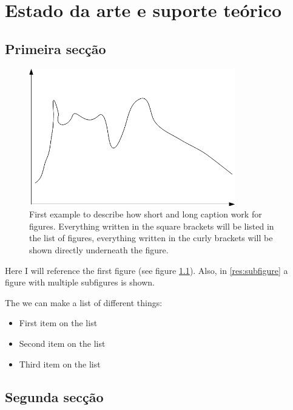 \chapter{\textbf{Estado da arte e suporte teórico}}

\section{Primeira secção}
\Blindtext

\begin{figure}[ht]
	\centering

		\includegraphics[width=0.8\textwidth]{pic/example.jpg}

	\caption[First example.]{First example to describe how short and long caption work for figures. Everything written in the square brackets will be listed in the list of figures, everything written in the curly brackets will be shown directly underneath the figure.}

	\label{fig:firstexample}
\end{figure}




Here I will reference the first figure (see figure \ref{fig:firstexample}). Also, in \ref{res:subfigure} a figure with multiple subfigures is shown.

\noindent %
The we can make a list of different things:

\begin{itemize} 
\item First item on the list
\item Second item on the list 
\item Third item on the list 
\end{itemize}


\section{Segunda secção}


